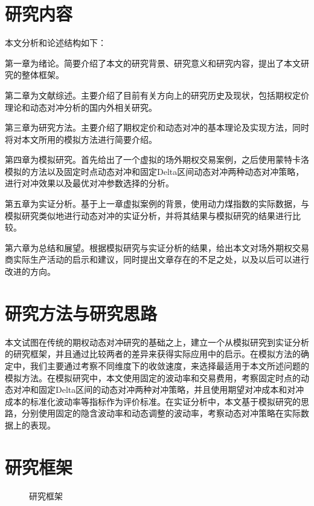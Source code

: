 \section{研究内容}

本文分析和论述结构如下：

第一章为绪论。简要介绍了本文的研究背景、研究意义和研究内容，提出了本文研究的整体框架。

第二章为文献综述。主要介绍了目前有关方向上的研究历史及现状，包括期权定价理论和动态对冲分析的国内外相关研究。

第三章为研究方法。主要介绍了期权定价和动态对冲的基本理论及实现方法，同时将对本文所用的模拟方法进行简要介绍。

第四章为模拟研究。首先给出了一个虚拟的场外期权交易案例，之后使用蒙特卡洛模拟的方法以及固定时点动态对冲和固定Delta区间动态对冲两种动态对冲策略，进行对冲效果以及最优对冲参数选择的分析。

第五章为实证分析。基于上一章虚拟案例的背景，使用动力煤指数的实际数据，与模拟研究类似地进行动态对冲的实证分析，并将其结果与模拟研究的结果进行比较。

第六章为总结和展望。根据模拟研究与实证分析的结果，给出本文对场外期权交易商实际生产活动的启示和建议，同时提出文章存在的不足之处，以及以后可以进行改进的方向。

\section{研究方法与研究思路}

本文试图在传统的期权动态对冲研究的基础之上，建立一个从模拟研究到实证分析的研究框架，并且通过比较两者的差异来获得实际应用中的启示。在模拟方法的确定中，我们主要通过考察不同维度下的收敛速度，来选择最适用于本文所述问题的模拟方法。在模拟研究中，本文使用固定的波动率和交易费用，考察固定时点的动态对冲和固定Delta区间的动态对冲两种对冲策略，并且使用期望对冲成本和对冲成本的标准化波动率等指标作为评价标准。在实证分析中，本文基于模拟研究的思路，分别使用固定的隐含波动率和动态调整的波动率，考察动态对冲策略在实际数据上的表现。

\newpage
\section{研究框架}

\begin{figure}[!htp]
    \centering
    \resizebox{6cm}{!}{}
    \caption{研究框架}
    \label{fig:flow_chart}
\end{figure}
